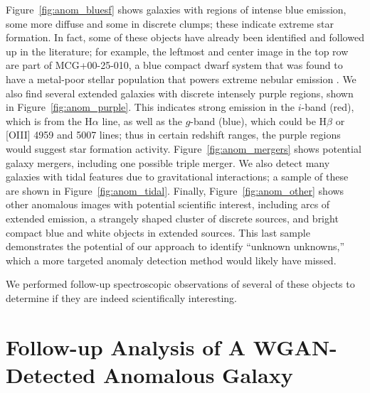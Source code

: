 Figure~\ref{fig:anom_bluesf} shows galaxies with regions of intense blue emission, some more diffuse and some in discrete clumps; these indicate extreme star formation.
In fact, some of these objects have already been identified and followed up in the literature; for example, the leftmost and center image in the top row are part of MCG+00-25-010, a blue compact dwarf system that was found to have a metal-poor stellar population that powers extreme nebular emission \citep{Senchyna2017}.
We also find several extended galaxies with discrete intensely purple regions, shown in Figure~\ref{fig:anom_purple}.
This indicates strong emission in the $i$-band (red), which is from the H$\alpha$ line, as well as the $g$-band (blue), which could be H$\beta$ or [OIII] 4959 and 5007 lines; thus in certain redshift ranges, the purple regions would suggest star formation activity.
Figure~\ref{fig:anom_mergers} shows potential galaxy mergers, including one possible triple merger. 
We also detect many galaxies with tidal features due to gravitational interactions; a sample of these are shown in Figure~\ref{fig:anom_tidal}.
Finally, Figure~\ref{fig:anom_other} shows other anomalous images with potential scientific interest, including arcs of extended emission, a strangely shaped cluster of discrete sources, and bright compact blue and white objects in extended sources.
This last sample demonstrates the potential of our approach to identify ``unknown unknowns,'' which a more targeted anomaly detection method would likely have missed.


We performed follow-up spectroscopic observations of several of these objects to determine if they are indeed scientifically interesting.



\section{Follow-up Analysis of A WGAN-Detected Anomalous Galaxy}
\label{sec:bluedot}

